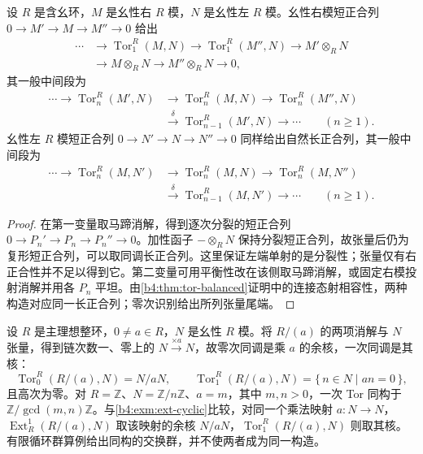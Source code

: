 \begin{theorem}\label{b4:thm:tor-long-exact}
	设 \(R\) 是含幺环，\(M\) 是幺性右 \(R\) 模，\(N\) 是幺性左 \(R\) 模。幺性右模短正合列 \(0\to M'\to M\to M''\to0\) 给出
	\[
		\begin{aligned}
			\cdots&\longrightarrow\operatorname{Tor}_1^R(M,N) \longrightarrow\operatorname{Tor}_1^R(M'',N) \longrightarrow M'\otimes_RN\\
			&\longrightarrow M\otimes_RN\longrightarrow M''\otimes_RN\longrightarrow0,
		\end{aligned}
	\]
	其一般中间段为
	\[
		\begin{aligned}
			\cdots\longrightarrow\operatorname{Tor}_n^R(M',N) &\longrightarrow\operatorname{Tor}_n^R(M,N) \longrightarrow\operatorname{Tor}_n^R(M'',N)\\
			&\xrightarrow{\delta}\operatorname{Tor}_{n-1}^R(M',N) \longrightarrow\cdots\qquad(n\ge1).
		\end{aligned}
	\]
	幺性左 \(R\) 模短正合列 \(0\to N'\to N\to N''\to0\) 同样给出自然长正合列，其一般中间段为
	\[
		\begin{aligned}
			\cdots\longrightarrow\operatorname{Tor}_n^R(M,N') &\longrightarrow\operatorname{Tor}_n^R(M,N) \longrightarrow\operatorname{Tor}_n^R(M,N'')\\
			&\xrightarrow{\delta}\operatorname{Tor}_{n-1}^R(M,N') \longrightarrow\cdots\qquad(n\ge1).
		\end{aligned}
	\]
\end{theorem}
\begin{proof}
	在第一变量取马蹄消解，得到逐次分裂的短正合列 \(0\to P_n'\to P_n\to P_n''\to0\)。加性函子 \(-\otimes_RN\) 保持分裂短正合列，故张量后仍为复形短正合列，可以取同调长正合列。这里保证左端单射的是分裂性；张量仅有右正合性并不足以得到它。第二变量可用平衡性改在该侧取马蹄消解，或固定右模投射消解并用各 \(P_n\) 平坦。由\cref{b4:thm:tor-balanced}证明中的连接态射相容性，两种构造对应同一长正合列；零次识别给出所列张量尾端。
\end{proof}

\begin{example}\label{b4:exm:tor-cyclic}
	设 \(R\) 是主理想整环，\(0\ne a\in R\)，\(N\) 是幺性 \(R\) 模。将 \(R/(a)\) 的两项消解与 \(N\) 张量，得到链次数一、零上的 \(N\xrightarrow{\times a}N\)，故零次同调是乘 \(a\) 的余核，一次同调是其核：
	\[
		\operatorname{Tor}_0^R(R/(a),N)=N/aN, \qquad \operatorname{Tor}_1^R(R/(a),N)=\{\,n\in N\mid an=0\,\},
	\]
	且高次为零。对 \(R=\mathbb Z\)、\(N=\mathbb Z/n\mathbb Z\)、\(a=m\)，其中 \(m,n>0\)，一次 Tor 同构于 \(\mathbb Z/\gcd(m,n)\mathbb Z\)。与\cref{b4:exm:ext-cyclic}比较，对同一个乘法映射 \(a:N\to N\)，\(\operatorname{Ext}_R^1(R/(a),N)\) 取该映射的余核 \(N/aN\)，\(\operatorname{Tor}_1^R(R/(a),N)\) 则取其核。有限循环群算例给出同构的交换群，并不使两者成为同一构造。
\end{example}

